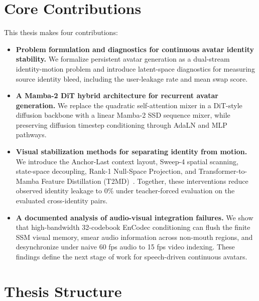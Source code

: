 \documentclass[12pt,letterpaper]{report}
\begin{document}
\section{Core Contributions}

This thesis makes four contributions:

\begin{itemize}
    \item \textbf{Problem formulation and diagnostics for continuous avatar identity stability.} We formalize persistent avatar generation as a dual-stream identity-motion problem and introduce latent-space diagnostics for measuring source identity bleed, including the user-leakage rate and mean swap score.
    
    \item \textbf{A Mamba-2 DiT hybrid architecture for recurrent avatar generation.} We replace the quadratic self-attention mixer in a DiT-style diffusion backbone with a linear Mamba-2 SSD sequence mixer, while preserving diffusion timestep conditioning through AdaLN and MLP pathways.
    
    \item \textbf{Visual stabilization methods for separating identity from motion.} We introduce the Anchor-Last context layout, Sweep-4 spatial scanning, state-space decoupling, Rank-1 Null-Space Projection, and Transformer-to-Mamba Feature Distillation (T2MD)~\cite{t2md2025}. Together, these interventions reduce observed identity leakage to 0\% under teacher-forced evaluation on the evaluated cross-identity pairs.
    
    \item \textbf{A documented analysis of audio-visual integration failures.} We show that high-bandwidth 32-codebook EnCodec conditioning can flush the finite SSM visual memory, smear audio information across non-mouth regions, and desynchronize under naive 60 fps audio to 15 fps video indexing. These findings define the next stage of work for speech-driven continuous avatars.
\end{itemize}

\section{Thesis Structure}
\end{document}
